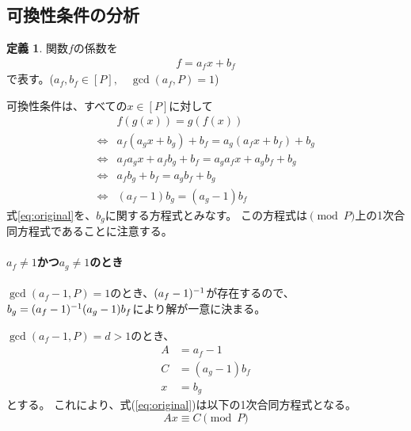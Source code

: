 \documentclass[a4paper,11pt,dvipdfmx]{jsarticle}
\theoremstyle{definition}
\newtheorem{definition}{定義}[section]
\begin{document}
\subsection{可換性条件の分析}
\begin{definition}
  関数$f$の係数を
  \begin{align}
    f = a_f x + b_f
  \end{align}で表す。($a_f,b_f\in[P],\quad \gcd(a_f, P) = 1$)
\end{definition}
可換性条件は、すべての$x\in[P]$に対して
\begin{align}
  &f(g(x)) = g(f(x))\\
  \iff &a_f(a_g x+b_g )+b_f = a_g (a_fx+b_f)+b_g \\
  \iff &a_fa_g x + a_fb_g  + b_f = a_g a_fx + a_g b_f + b_g \\
  \iff &a_fb_g  + b_f = a_g b_f + b_g \\
  \iff &(a_f-1)b_g  = (a_g -1)b_f\label{eq:original}
\end{align}
式\ref{eq:original}を、$b_g $に関する方程式とみなす。
この方程式は$\pmod{P}$上の1次合同方程式であることに注意する。
\paragraph{$a_f\neq1$かつ$a_g \neq1$のとき\\}
  $\gcd(a_f-1, P)=1$のとき、$(a_f-1)^{-1}$が存在するので、$b_g =(a_f-1)^{-1}(a_g -1)b_f$により解が一意に決まる。

  $\gcd(a_f-1, P)=d>1$のとき、
  \begin{align}
      A &= a_f - 1 \\
      C &= (a_g  - 1)b_f \\
      x &= b_g 
  \end{align}とする。
  これにより、式(\ref{eq:original})は以下の1次合同方程式となる。
  \begin{equation}
      Ax \equiv C \pmod P \label{eq:simplified}
  \end{equation}
\end{document}
